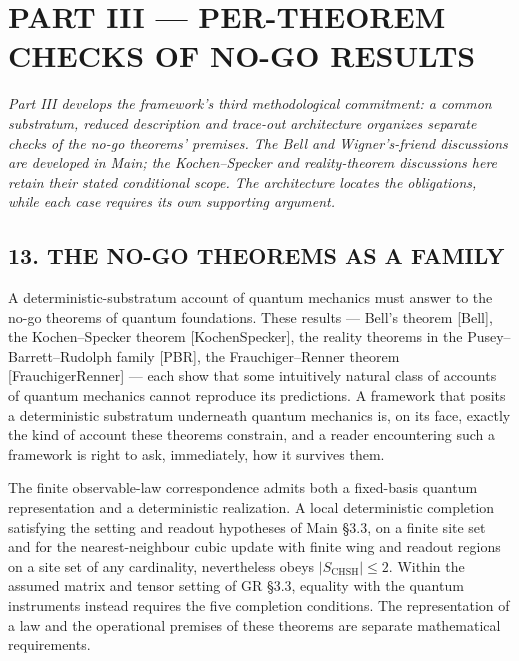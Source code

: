 \documentclass[
]{article}
\begin{document}
\hypertarget{part-iii-per-theorem-checks-of-no-go-results}{%
\section{PART III --- PER-THEOREM CHECKS OF NO-GO
RESULTS}\label{part-iii-per-theorem-checks-of-no-go-results}}

\emph{Part III develops the framework's third methodological commitment:
a common substratum, reduced description and trace-out architecture
organizes separate checks of the no-go theorems' premises. The Bell and
Wigner's-friend discussions are developed in Main; the Kochen--Specker
and reality-theorem discussions here retain their stated conditional
scope. The architecture locates the obligations, while each case
requires its own supporting argument.}

\hypertarget{the-no-go-theorems-as-a-family}{%
\subsection{13. THE NO-GO THEOREMS AS A
FAMILY}\label{the-no-go-theorems-as-a-family}}

A deterministic-substratum account of quantum mechanics must answer to
the no-go theorems of quantum foundations. These results --- Bell's
theorem {[}Bell{]}, the Kochen--Specker theorem {[}KochenSpecker{]}, the
reality theorems in the Pusey--Barrett--Rudolph family {[}PBR{]}, the
Frauchiger--Renner theorem {[}FrauchigerRenner{]} --- each show that
some intuitively natural class of accounts of quantum mechanics cannot
reproduce its predictions. A framework that posits a deterministic
substratum underneath quantum mechanics is, on its face, exactly the
kind of account these theorems constrain, and a reader encountering such
a framework is right to ask, immediately, how it survives them.

The finite observable-law correspondence admits both a fixed-basis
quantum representation and a deterministic realization. A local
deterministic completion satisfying the setting and readout hypotheses
of Main §3.3, on a finite site set and for the nearest-neighbour cubic
update with finite wing and readout regions on a site set of any
cardinality, nevertheless obeys \(|S_{\mathrm{CHSH}}|\le2\). Within the
assumed matrix and tensor setting of GR §3.3, equality with the quantum
instruments instead requires the five completion conditions. The
representation of a law and the operational premises of these theorems
are separate mathematical requirements.
\end{document}
